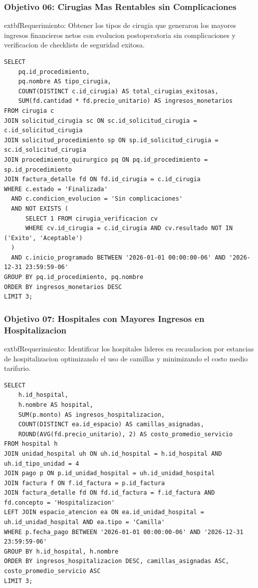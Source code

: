 \documentclass[11pt,a4paper]{article}
\begin{document}
\subsubsection{Objetivo 06: Cirugias Mas Rentables sin Complicaciones}
	extbf{Requerimiento:} Obtener los tipos de cirugia que generaron los mayores ingresos financieros netos con evolucion postoperatoria sin complicaciones y verificacion de checklists de seguridad exitosa.
\begin{lstlisting}[style=sqlstyle]
SELECT 
    pq.id_procedimiento,
    pq.nombre AS tipo_cirugia,
    COUNT(DISTINCT c.id_cirugia) AS total_cirugias_exitosas,
    SUM(fd.cantidad * fd.precio_unitario) AS ingresos_monetarios
FROM cirugia c
JOIN solicitud_cirugia sc ON sc.id_solicitud_cirugia = c.id_solicitud_cirugia
JOIN solicitud_procedimiento sp ON sp.id_solicitud_cirugia = sc.id_solicitud_cirugia
JOIN procedimiento_quirurgico pq ON pq.id_procedimiento = sp.id_procedimiento
JOIN factura_detalle fd ON fd.id_cirugia = c.id_cirugia
WHERE c.estado = 'Finalizada'
  AND c.condicion_evolucion = 'Sin complicaciones'
  AND NOT EXISTS (
      SELECT 1 FROM cirugia_verificacion cv 
      WHERE cv.id_cirugia = c.id_cirugia AND cv.resultado NOT IN ('Exito', 'Aceptable')
  )
  AND c.inicio_programado BETWEEN '2026-01-01 00:00:00-06' AND '2026-12-31 23:59:59-06'
GROUP BY pq.id_procedimiento, pq.nombre
ORDER BY ingresos_monetarios DESC
LIMIT 3;
\end{lstlisting}

\subsubsection{Objetivo 07: Hospitales con Mayores Ingresos en Hospitalizacion}
	extbf{Requerimiento:} Identificar los hospitales lideres en recaudacion por estancias de hospitalizacion optimizando el uso de camillas y minimizando el costo medio tarifario.
\begin{lstlisting}[style=sqlstyle]
SELECT 
    h.id_hospital,
    h.nombre AS hospital,
    SUM(p.monto) AS ingresos_hospitalizacion,
    COUNT(DISTINCT ea.id_espacio) AS camillas_asignadas,
    ROUND(AVG(fd.precio_unitario), 2) AS costo_promedio_servicio
FROM hospital h
JOIN unidad_hospital uh ON uh.id_hospital = h.id_hospital AND uh.id_tipo_unidad = 4
JOIN pago p ON p.id_unidad_hospital = uh.id_unidad_hospital
JOIN factura f ON f.id_factura = p.id_factura
JOIN factura_detalle fd ON fd.id_factura = f.id_factura AND fd.concepto = 'Hospitalizacion'
LEFT JOIN espacio_atencion ea ON ea.id_unidad_hospital = uh.id_unidad_hospital AND ea.tipo = 'Camilla'
WHERE p.fecha_pago BETWEEN '2026-01-01 00:00:00-06' AND '2026-12-31 23:59:59-06'
GROUP BY h.id_hospital, h.nombre
ORDER BY ingresos_hospitalizacion DESC, camillas_asignadas ASC, costo_promedio_servicio ASC
LIMIT 3;
\end{lstlisting}
\end{document}
